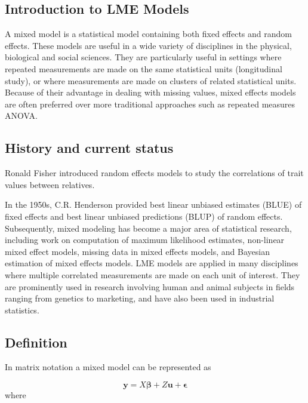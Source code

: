 \subsection{Introduction to LME Models}

A mixed model is a statistical model containing both fixed effects and random effects. These models are useful in a wide variety of disciplines in the physical, biological and social sciences. They are particularly useful in settings where repeated measurements are made on the same statistical units (longitudinal study), or where measurements are made on clusters of related statistical units. Because of their advantage in dealing with missing values, mixed effects models are often preferred over more traditional approaches such as repeated measures ANOVA.


\subsection{History and current status}
Ronald Fisher introduced random effects models to study the correlations of trait values between relatives.

In the 1950s, C.R. Henderson provided best linear unbiased estimates (BLUE) of fixed effects and best linear unbiased predictions (BLUP) of random effects. 
Subsequently, mixed modeling has become a major area of statistical research, including work on computation of maximum likelihood estimates, non-linear mixed effect models, missing data in mixed effects models, and Bayesian estimation of mixed effects models. LME models are applied in many disciplines where multiple correlated measurements are made on each unit of interest. They are prominently used in research involving human and animal subjects in fields ranging from genetics to marketing, and have also been used in industrial statistics.

\subsection{Definition}
In matrix notation a mixed model can be represented as

\[\boldsymbol{y} = X \boldsymbol{\beta} + Z \boldsymbol{u} + \boldsymbol{\epsilon}\]
where

